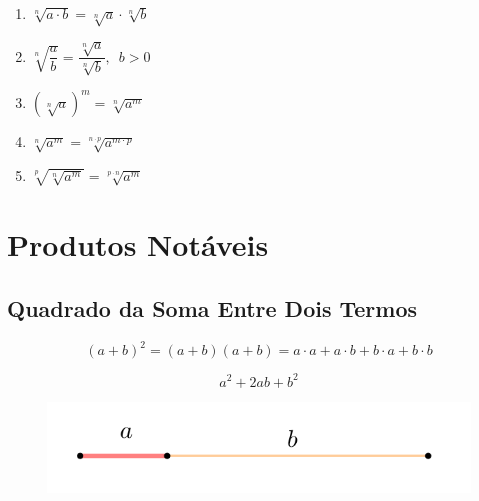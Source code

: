 \begin{enumerate}
\item $\sqrt[n]{a \cdot b} = \sqrt[n]{a} \cdot \sqrt[n]{b} $

\item $\sqrt[n]{\dfrac{a}{b}} = \dfrac{\sqrt[n]{a}}{\sqrt[n]{b}} ,\,\,\, b > 0$

\item $(\sqrt[n]{a})^m = \sqrt[n]{a^m}$

\item $\sqrt[n]{a^m} = \sqrt[n\cdot p]{a^{m\cdot p}}$

\item $\sqrt[p]{\sqrt[n]{a^m}} = \sqrt[p \cdot n]{a^m}$
\end{enumerate}

\newpage
\section{Produtos Notáveis}

\subsection{Quadrado da Soma Entre Dois Termos}

	
	$$(a+b)^{2} = (a+b)(a+b) = a\cdot a + a\cdot b + b\cdot a + b\cdot b $$
	
	
	$$a^2+2ab+b^2$$
	
\begin{figure}[H]
	\centering
	
	\includegraphics[scale=3.5]{imagens/soma-quadrado1.png}

\end{figure}

